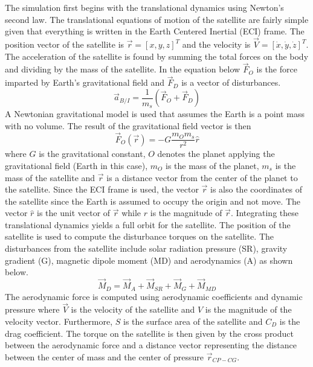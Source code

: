 \documentclass[conf]{new-aiaa}
\begin{document}
The simulation first begins with the translational dynamics using Newton's second law. The translational equations of motion of the satellite are fairly simple given that everything is written in the Earth Centered Inertial (ECI) frame. The position vector
of the satellite is $\vec{r} = [x,y,z]^T$ and the velocity is
$\vec{V}=[\dot{x},\dot{y},\dot{z}]^T$. The acceleration of
the satellite is found by summing the total forces on the body
and dividing by the mass of the satellite. In the equation below
$\vec{F}_O$ is the force imparted by Earth's gravitational field and $\vec{F}_D$ is a vector of disturbances.
\begin{equation}
  \vec{a}_{B/I} = \frac{1}{m_s} \left(\vec{F}_O + \vec{F}_D \right)
\end{equation}
A Newtonian gravitational model is used that assumes the Earth is a point mass with no volume. The result of the gravitational field vector is then
\begin{equation}\label{e:gravity}
  \vec{F}_{O}(\vec{r}) = -G\frac{m_{O} m_s}{r^2}\hat{r}
\end{equation}
where $G$ is the gravitational constant, $O$ denotes the planet
applying the gravitational field (Earth in this case), $m_O$ is the mass of the
planet, $m_s$ is the mass of the satellite and $\vec{r}$ is a distance vector from the center of the planet to the satellite. Since the ECI frame is used, the vector $\vec{r}$ is also the coordinates of the satellite since the Earth is assumed to occupy the origin and not move. The vector $\hat{r}$ is the unit vector of $\vec{r}$ while $r$ is the magnitude of $\vec{r}$. Integrating these translational dynamics yields a full orbit for the satellite. The position of the satellite is used to compute the disturbance torques on the satellite. The disturbances from the satellite include solar radiation pressure (SR), gravity gradient (G), magnetic dipole moment (MD) and aerodynamics (A) as shown below.
\begin{equation}
    \vec{M}_D = \vec{M}_A + \vec{M}_{SR} + \vec{M}_G + \vec{M}_{MD}
\end{equation}
The aerodynamic force is computed using aerodynamic coefficients and dynamic pressure where $\vec{V}$ is the velocity of the satellite and $V$ is the magnitude of the velocity vector. Furthermore, $S$ is the surface area of the satellite and $C_D$ is the drag coefficient. The torque on the satellite is then given by the cross product between the aerodynamic force and a distance vector representing the distance between the center of mass and the center of pressure $\vec{r}_{CP-CG}$.
\end{document}
